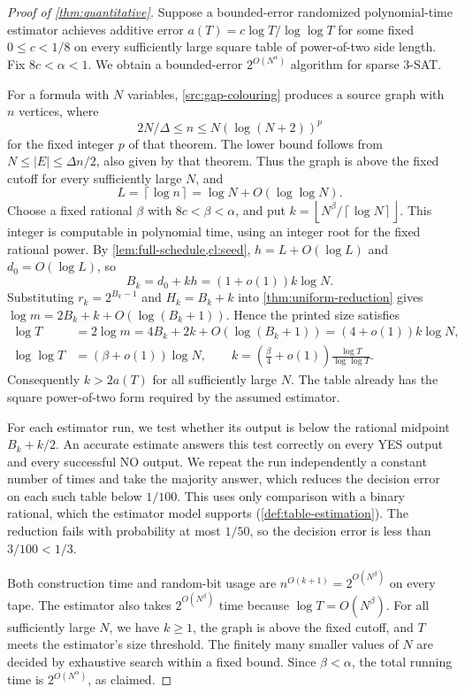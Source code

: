 \documentclass[11pt,letterpaper]{article} \usepackage[utf8]{inputenc}
\theoremstyle{plain} \newtheorem{theorem}{Theorem}[section]
\theoremstyle{definition} \newaliascnt{definition}{theorem}
\newcommand{\ceil}[1]{\left\lceil#1\right\rceil}
\newcommand{\floor}[1]{\left\lfloor#1\right\rfloor}
\begin{document}
\begin{proof}[Proof of \cref{thm:quantitative}]
\label{proof:thm:quantitative}
Suppose a bounded-error randomized polynomial-time estimator achieves additive
error $a(T)=c\log T/\log\log T$ for some fixed $0\le c<1/8$ on every
sufficiently large square table of power-of-two side length. Fix
$8c<\alpha<1$. We obtain a bounded-error $2^{O(N^\alpha)}$ algorithm for
sparse $3$-SAT.

For a formula with $N$ variables, \cref{src:gap-colouring} produces a source
graph with $n$ vertices, where
\[
2N/\Delta\le n\le N(\log(N+2))^p
\]
for the fixed integer $p$ of that theorem. The lower bound follows from
$N\le|E|\le\Delta n/2$, also given by that theorem.
Thus the graph is above the fixed cutoff for every sufficiently large $N$, and
\[
L=\ceil{\log n}=\log N+O(\log\log N).
\]
Choose a fixed rational $\beta$ with $8c<\beta<\alpha$, and put
$k=\floor{N^\beta/\ceil{\log N}}$. This integer is computable in polynomial
time, using an integer root for the fixed rational power. By
\cref{lem:full-schedule,cl:seed}, $h=L+O(\log L)$ and $d_0=O(\log L)$, so
\[
B_k=d_0+kh=(1+o(1))k\log N.
\]
Substituting $r_k=2^{B_k-1}$ and $H_k=B_k+k$ into
\cref{thm:uniform-reduction} gives
$\log m=2B_k+k+O(\log(B_k+1))$. Hence the printed size satisfies
\begin{align}
\log T&=2\log m=4B_k+2k+O(\log(B_k+1))
             =(4+o(1))k\log N,\label{eq:quantitative-size}\\
\log\log T&=(\beta+o(1))\log N,
\qquad k=\left(\frac\beta4+o(1)\right)\frac{\log T}{\log\log T}.
\end{align}
Consequently $k>2a(T)$ for all sufficiently large $N$. The table already has
the square power-of-two form required by the assumed estimator.

For each estimator run, we test whether its output is below the rational
midpoint $B_k+k/2$. An accurate estimate answers this test correctly on every
YES output and every successful NO output. We repeat the run independently a
constant number of times and take the majority answer, which reduces the
decision error on each such table below $1/100$. This uses only comparison with a binary rational, which the
estimator model supports (\cref{def:table-estimation}). The reduction
fails with probability at most $1/50$, so the decision error is less than
$3/100<1/3$.

Both construction time and random-bit usage are
$n^{O(k+1)}=2^{O(N^\beta)}$ on every tape. The estimator also takes
$2^{O(N^\beta)}$ time because $\log T=O(N^\beta)$.
For all sufficiently large $N$, we have $k\ge1$, the graph is above the fixed cutoff, and $T$ meets the estimator's size threshold.
The finitely many smaller values of $N$ are decided by exhaustive search within
a fixed bound. Since $\beta<\alpha$, the total running time is
$2^{O(N^\alpha)}$, as claimed.
\end{proof}
\end{document}
